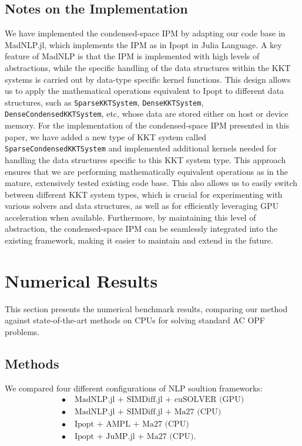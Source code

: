 \subsection{Notes on the Implementation}
We have implemented the condensed-space IPM by adapting our code base
in MadNLP.jl, which implements the IPM as in Ipopt in Julia Language.
A key feature of MadNLP is that the IPM is implemented with
high levels of abstractions, while the specific handling of the data
structures within the KKT systems is carried out by data-type specific
kernel functions. This design allows us to apply the mathematical
operations equivalent to Ipopt to different data structures, such as
{\tt SparseKKTSystem}, {\tt DenseKKTSystem}, {\tt
DenseCondensedKKTSystem}, etc, whose data are stored either on host or
device memory. For the implementation of the condensed-space IPM
presented in this paper, we have added a new type of KKT system called
{\tt SparseCondensedKKTSystem} and implemented additional kernels
needed for handling the data structures specific to this KKT system
type. This approach ensures that we are performing mathematically
equivalent operations as in the mature, extensively tested existing
code base. This also allows us to easily switch between different KKT
system types, which is crucial for experimenting with various solvers
and data structures, as well as for efficiently leveraging GPU
acceleration when available. Furthermore, by maintaining this level of
abstraction, the condensed-space IPM can be seamlessly integrated into
the existing framework, making it easier to maintain and extend in the
future.

\section{Numerical Results}\label{sec:num}

This section presents the numerical benchmark results, comparing our
method against state-of-the-art methods on CPUs for solving standard
AC OPF problems.

\subsection{Methods}

We compared four different configurations of NLP soultion frameworks:
\begin{align}
  \label{config-1}\tag{Config 1} \bullet\;&\text{MadNLP.jl + SIMDiff.jl + cuSOLVER (GPU)}\\
  \label{config-2}\tag{Config 2} \bullet\;&\text{MadNLP.jl + SIMDiff.jl + Ma27 (CPU)}\\
  \label{config-3}\tag{Config 3} \bullet\;&\text{Ipopt + AMPL + Ma27 (CPU)}\\
  \label{config-4}\tag{Config 4} \bullet\;&\text{Ipopt + JuMP.jl + Ma27 (CPU)}.
\end{align}


